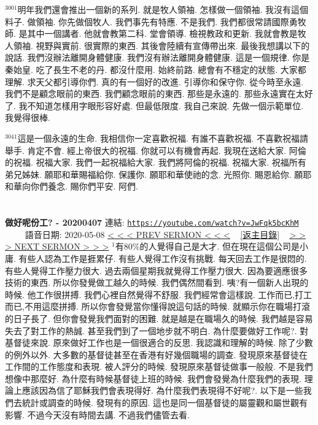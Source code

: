 \documentclass{book}
\begin{document}
$^{3001}$明年我們還會推出一個新的系列.
就是牧人領袖.
怎樣做一個領袖.
我沒有這個料子.
做領袖.
你先做個牧人.
我們事先有特應.
不是我們.
我們都很常請國際勇牧師.
是其中一個講者.
他就會教第二科.
堂會領導.
檢視教政和更新.
我就會教是牧人領袖.
視野與實前.
很實際的東西.
其後會陸續有宣傳帶出來.
最後我想講以下的說話.
我們沒辦法離開身體健康.
我們沒有辦法離開身體健康.
這是一個規律.
你是秦始皇.
吃了長生不老的丹.
都沒什麼用.
始終前路.
總會有不穩定的狀態.
大家都理解.
求天父都引導你們.
真的有一個好的改進.
引導你和保守你.
從今時至永遠.
我們不是顧念眼前的東西.
我們顧念眼前的東西.
那些是永遠的.
那些永遠實在太好了.
我不知道怎樣用字眼形容好處.
但最低限度.
我自己來說.
先做一個示範單位.
我覺得很棒.

$^{3041}$這是一個永遠的生命.
我相信你一定喜歡祝福.
有誰不喜歡祝福.
不喜歡祝福請舉手.
肯定不會.
經上帝很大的祝福.
你就可以有機會再起.
我現在送給大家.
阿倫的祝福.
祝福大家.
我們一起祝福給大家.
我們將阿倫的祝福.
祝福大家.
祝福所有弟兄姊妹.
願耶和華賜福給你.
保護你.
願耶和華使祂的念.
光照你.
賜恩給你.
願耶和華向你們養念.
賜你們平安.
阿們.
\newpage



\section{}
\label{sec:JwFqk5bcKhM}
\textbf{做好呢份工? - 20200407}
\newline
\newline
連結: \href{https://youtube.com/watch?v=JwFqk5bcKhM}{\texttt{https://youtube.com/watch?v=JwFqk5bcKhM}} ~~~~ 語音日期: 2020-05-08
\newline
\newline
\hyperref[sec:UCyv23j5rVY]{\small{< < < PREV SERMON < < <}}
~
\hyperref[sec:index]{\small{[返主目錄]}}
~
\hyperref[sec:9pqygotXAuo]{\small{> > > NEXT SERMON > > >}}
\newline
\newline
$^{1}$有80\%的人覺得自己是大才.
但在現在這個公司是小庸.
有些人認為工作是捱累仔.
有些人覺得工作沒有挑戰.
每天回去工作是很悶的.
有些人覺得工作壓力很大.
過去兩個星期我就覺得工作壓力很大.
因為要適應很多技術的東西.
所以你發覺做工越久的時候.
我們偶然間看到.
咦?有一個新人出現的時候.
他工作很拼搏.
我們心裡自然覺得不舒服.
我們經常會這樣說.
工作而已,打工而已,不用這麼拼搏.
所以你會發覺當你懂得說這句話的時候.
就顯示你在職場打滾的日子長了.
但你會發覺我們面對的困難.
就是越是在職場久的時候.
我們越是容易失去了對工作的熱誠.
甚至我們到了一個地步就不明白.
為什麼要做好工作呢?.
對基督徒來說.
原來做好工作也是一個很適合的反思.
我認識和理解的時候.
除了少數的例外以外.
大多數的基督徒甚至在香港有好幾個職場的調查.
發現原來基督徒在工作間的工作態度和表現.
被人評分的時候.
發現原來基督徒做事一般般.
不是我們想像中那麼好.
為什麼有時候基督徒上班的時候.
我們會發覺為什麼我們的表現.
理論上應該因為信了耶穌我們會表現得好.
為什麼我們表現得不好呢?.
以下是一些我們去統計或調查的時候.
發現有的原因.
這也是同一個基督徒的屬靈觀和屬世觀有影響.
不過今天沒有時間去講.
不過我們儘管去看.
\end{document}
